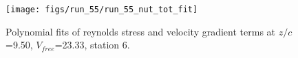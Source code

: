 \begin{figure}[H]
\centering
\texttt{[image: figs/run\_55/run\_55\_nut\_tot\_fit]}
\caption{Polynomial fits of reynolds stress and velocity gradient terms at $z/c$=9.50, $V_{free}$=23.33, station 6.}
\label{fig:run_55_nut_tot_fit}
\end{figure}


